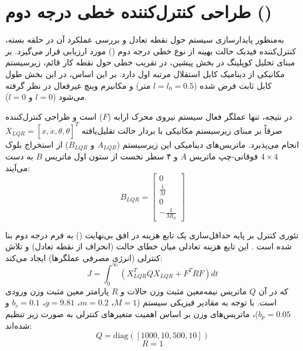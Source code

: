 
\section{طراحی کنترل‌کننده خطی درجه دوم ()}
\label{sec:lqr_design}

به‌منظور پایدارسازی سیستم حول نقطه تعادل و بررسی عملکرد آن در حلقه بسته، کنترل‌کننده فیدبک حالت بهینه از نوع خطی درجه دوم () مورد ارزیابی قرار می‌گیرد. بر مبنای تحلیل کوپلینگ در بخش پیشین، در تقریب خطی حول نقطه کار قائم، زیرسیستم مکانیکی از دینامیک کابل استقلال مرتبه اول دارد. بر این اساس، در این بخش طول کابل ثابت فرض شده ($l = l_0 = 0.5$ متر) و مکانیزم وینچ غیرفعال در نظر گرفته می‌شود ($\dot{l} = 0$ و $\ddot{l} = 0$).

در نتیجه، تنها عملگر فعال سیستم نیروی محرک ارابه ($F$) است و طراحی کنترل‌کننده صرفاً بر مبنای زیرسیستم مکانیکی با بردار حالت تقلیل‌یافته $X_{LQR} = [x, \dot{x}, \theta, \dot{\theta}]^T$ انجام می‌پذیرد. ماتریس‌های دینامیکی این زیرسیستم ($A_{LQR}$ و $B_{LQR}$) از استخراج بلوک $4 \times 4$ فوقانی-چپ ماتریس $A$ و ۴ سطر نخست از ستون اول ماتریس $B$ به دست می‌آیند:
\begin{equation}
    B_{LQR} = \begin{bmatrix} 0 \\ \frac{1}{M} \\ 0 \\ -\frac{1}{M l_0} \end{bmatrix}
\end{equation}

تئوری کنترل  بر پایه حداقل‌سازی یک تابع هزینه در افق بی‌نهایت () به فرم درجه دوم بنا شده است \cite{Anderson1990Optimal}. این تابع هزینه تعادلی میان خطای حالت (انحراف از نقطه تعادل) و تلاش کنترلی (انرژی مصرفی عملگرها) ایجاد می‌کند:
\begin{equation}
    J = \int_{0}^{\infty} \left( X_{LQR}^T Q X_{LQR} + F^T R F \right) dt
\end{equation}
که در آن $Q$ ماتریس نیمه‌معین مثبت وزن حالات و $R$ پارامتر معین مثبت وزن ورودی است. با توجه به مقادیر فیزیکی سیستم ($M = 1$، $m = 0.2$، $g = 9.81$، $b_c = 0.1$ و $b_p = 0.05$)، ماتریس‌های وزن بر اساس اهمیت متغیرهای کنترلی به صورت زیر تنظیم شده‌اند:
\begin{equation}
    Q = \text{diag}([1000, 10, 500, 10])
\end{equation}
\begin{equation}
    R = 1
\end{equation}

